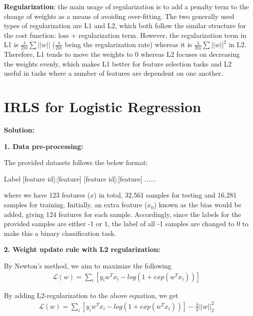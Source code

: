 \documentclass[12pt,a4paper]{article}
\begin{document}
\begin{enumerate}
		\noindent \textbf{\small Regularization}: the main usage of regularization is to add a penalty term to the change of weights as a means of avoiding over-fitting. The two generally used types of regularization are L1 and L2, which both follow the similar structure for the cost function: loss + regularization term. However, the regularization term in L1 is $\frac{\lambda}{2m}\sum||w||$ ($\frac{\lambda}{2m}$ being the regularization rate) whereas it is $\frac{\lambda}{2m}\sum||w||^2$ in L2. Therefore, L1 tends to move the weights to 0 whereas L2 focuses on decreasing the weights evenly, which makes L1 better for feature selection tasks and L2 useful in tasks where a number of features are dependent on one another.
		
	\end{enumerate}
	
	
	\section{IRLS for Logistic Regression}
	
	\noindent \textbf{Solution:}
	\vspace{0.2cm}
	
	\noindent \textbf{1. Data pre-processing:}
	\vspace{0.2cm}
	
	\noindent The provided datasets follows the below format:
	\begin{center}
		Label [feature id]:[feature] [feature id]:[feature] ......
	\end{center}
	where we have 123 features ($x$) in total, 32,561 samples for testing and 16,281 samples for training. Initially, an extra feature ($x_0$) known as the bias would be added, giving 124 features for each sample. Accordingly, since the labels for the provided samples are either -1 or 1, the label of all -1 samples are changed to 0 to make this a binary classification task.
	
	\vspace{0.4cm}
	\noindent \textbf{2. Weight update rule with L2 regularization:}  
	\vspace{0.2cm}
	
	\noindent By Newton's method, we aim to maximize the following
	\begin{align}
		\mathcal{L}(w) = \sum_{i}[y_iw^Tx_i-log(1+exp(w^Tx_i))]
	\end{align}
	
	\vspace{-0.2cm}
	\noindent By adding L2-regularization to the above equation, we get
	\begin{align}
	\mathcal{L}(w) = \sum_{i}[y_iw^Tx_i-log(1+exp(w^Tx_i))] - \frac{\lambda}{2}||w||^2_2
	\end{align}
	
\end{document}
